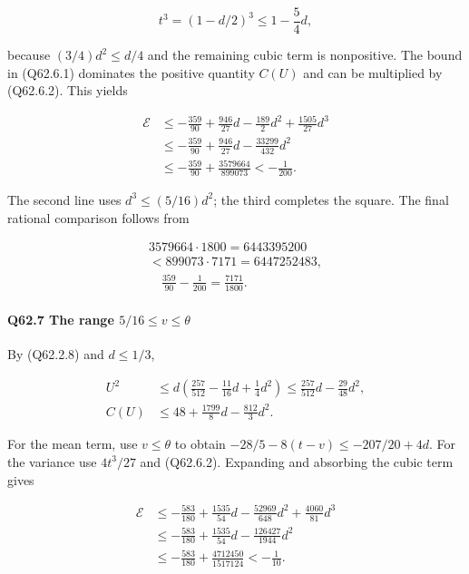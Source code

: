 \[
t^3=(1-d/2)^3\le1-\frac54d,
\tag{Q62.6.2}\label{eq:Q62:Q62:6:2}
\]

because $(3/4)d^2\le\allowbreak  d/4$ and the remaining cubic term is nonpositive.
The bound in (Q62.6.1) dominates the positive quantity $C(U)$ and can be multiplied by (Q62.6.2). This yields

\[
\begin{aligned}
\mathcal E
&\le-\frac{359}{90}+\frac{946}{27}d-\frac{189}{2}d^2
+\frac{1505}{27}d^3\\
&\le-\frac{359}{90}+\frac{946}{27}d-\frac{33299}{432}d^2\\
&\le-\frac{359}{90}+\frac{3579664}{899073}<-\frac1{200}.
\end{aligned}
\tag{Q62.6.3}\label{eq:Q62:Q62:6:3}
\]

The second line uses $d^3\le\allowbreak (5/16)d^2$; the third completes the square.
The final rational comparison follows from

\[
\begin{gathered}
3579664\cdot1800=6443395200\\
<899073\cdot7171=6447252483,\\
\quad \frac{359}{90}-\frac1{200}=\frac{7171}{1800}.
\end{gathered}
\]



\paragraph{Q62.7 The range $5/16\le\allowbreak  v\le\allowbreak \theta$}

By (Q62.2.8) and $d\le\allowbreak 1/3$,

\[
\begin{aligned}
U^2&\le d\left(\frac{257}{512}-\frac{11}{16}d+\frac14d^2\right)
\le\frac{257}{512}d-\frac{29}{48}d^2,\\
C(U)&\le48+\frac{1799}{8}d-\frac{812}{3}d^2.
\end{aligned}
\tag{Q62.7.1}\label{eq:Q62:Q62:7:1}
\]

For the mean term, use $v\le\allowbreak \theta$ to obtain
$-28/5-8(t-v)\le\allowbreak -207/20+4d$.
For the variance use $4t^3/27$ and (Q62.6.2). Expanding and absorbing the cubic term gives

\[
\begin{aligned}
\mathcal E
&\le-\frac{583}{180}+\frac{1535}{54}d
-\frac{52969}{648}d^2+\frac{4060}{81}d^3\\
&\le-\frac{583}{180}+\frac{1535}{54}d-\frac{126427}{1944}d^2\\
&\le-\frac{583}{180}+\frac{4712450}{1517124}<-\frac1{10}.
\end{aligned}
\tag{Q62.7.2}\label{eq:Q62:Q62:7:2}
\]

